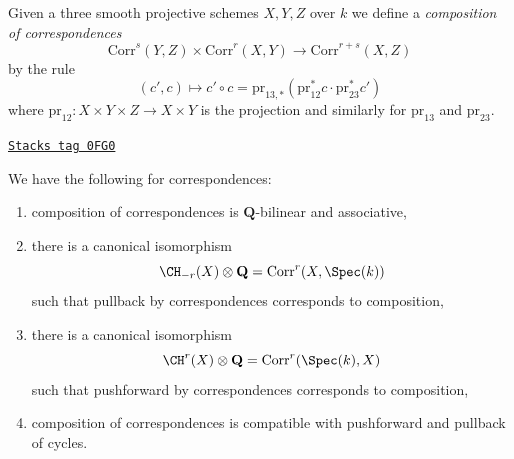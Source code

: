 \medskip\noindent
Given a three smooth projective schemes $X, Y, Z$ over $k$ we define a
{\it composition of correspondences}
$$
\text{Corr}^s(Y, Z)
\times
\text{Corr}^r(X, Y)
\longrightarrow
\text{Corr}^{r + s}(X, Z)
$$
by the rule
$$
(c', c)
\longmapsto
c' \circ c =
\text{pr}_{13, *}(\text{pr}_{12}^*c \cdot \text{pr}_{23}^*c')
$$
where $\text{pr}_{12} : X \times Y \times Z \to X \times Y$
is the projection and similarly for $\text{pr}_{13}$ and $\text{pr}_{23}$.

\begin{lemma}
\label{weil-lemma-composition-correspondences}
\href{https://stacks.math.columbia.edu/tag/0FG0}{\texttt{Stacks tag 0FG0}}

We have the following for correspondences:
\begin{enumerate}
\item composition of correspondences is $\mathbf{Q}$-bilinear
and associative,
\item there is a canonical isomorphism
$$
\CH_{-r}(X) \otimes \mathbf{Q} = \text{Corr}^r(X, \Spec(k))
$$
such that pullback by correspondences corresponds to composition,
\item there is a canonical isomorphism
$$
\CH^r(X) \otimes \mathbf{Q} = \text{Corr}^r(\Spec(k), X)
$$
such that pushforward by correspondences corresponds to composition,
\item composition of correspondences is compatible with pushforward and
pullback of cycles.
\end{enumerate}
\end{lemma}

